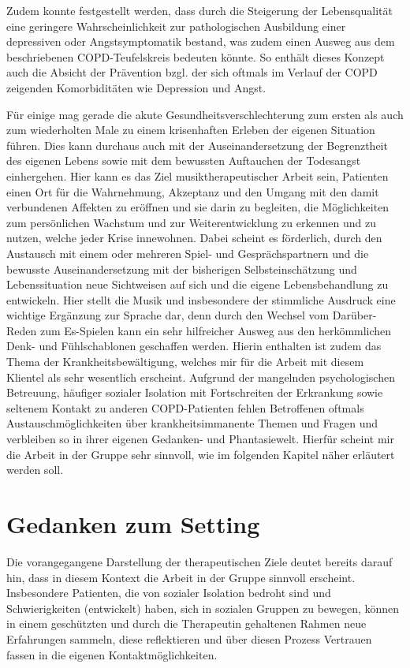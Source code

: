 Zudem konnte festgestellt werden, dass durch die Steigerung der Lebensqualität eine geringere Wahrscheinlichkeit zur pathologischen Ausbildung einer depressiven oder Angstsymptomatik bestand, was zudem einen Ausweg aus dem beschriebenen COPD-Teufelskreis bedeuten könnte. So enthält dieses Konzept auch die Absicht der Prävention bzgl. der sich oftmals im Verlauf der COPD zeigenden Komorbiditäten wie Depression und Angst.

Für einige mag gerade die akute Gesundheitsverschlechterung zum ersten als auch zum wiederholten Male zu einem krisenhaften Erleben der eigenen Situation führen. Dies kann durchaus auch mit der Auseinandersetzung der Begrenztheit des eigenen Lebens sowie mit dem bewussten Auftauchen der Todesangst einhergehen. Hier kann es das Ziel musiktherapeutischer Arbeit sein, Patienten einen Ort für die Wahrnehmung, Akzeptanz und den Umgang mit den damit verbundenen Affekten zu eröffnen und sie darin zu begleiten, die Möglichkeiten zum persönlichen Wachstum und zur Weiterentwicklung zu erkennen und zu nutzen, welche jeder Krise innewohnen. Dabei scheint es förderlich, durch den Austausch mit einem oder mehreren Spiel- und Gesprächspartnern und die bewusste Auseinandersetzung mit der bisherigen Selbsteinschätzung und Lebenssituation neue Sichtweisen auf sich und die eigene Lebensbehandlung zu entwickeln. Hier stellt die Musik und insbesondere der stimmliche Ausdruck eine wichtige Ergänzung zur Sprache dar, denn durch den Wechsel vom Darüber-Reden zum Es-Spielen kann ein sehr hilfreicher Ausweg aus den herkömmlichen Denk- und Fühlschablonen geschaffen werden. Hierin enthalten ist zudem das Thema der Krankheitsbewältigung, welches mir für die Arbeit mit diesem Klientel als sehr wesentlich erscheint. Aufgrund der mangelnden psychologischen Betreuung, häufiger sozialer Isolation mit Fortschreiten der Erkrankung sowie seltenem Kontakt zu anderen COPD-Patienten fehlen Betroffenen oftmals Austauschmöglichkeiten über krankheitsimmanente Themen und Fragen und verbleiben so in ihrer eigenen Gedanken- und Phantasiewelt. Hierfür scheint mir die Arbeit in der Gruppe sehr sinnvoll, wie im folgenden Kapitel näher erläutert werden soll.

\section{Gedanken zum Setting}
\label{section:gedanken_zum_setting}
Die vorangegangene Darstellung der therapeutischen Ziele deutet bereits darauf hin, dass in diesem Kontext die Arbeit in der Gruppe sinnvoll erscheint. Insbesondere Patienten, die von sozialer Isolation bedroht sind und Schwierigkeiten (entwickelt) haben, sich in sozialen Gruppen zu bewegen, können in einem geschützten und durch die Therapeutin gehaltenen Rahmen neue Erfahrungen sammeln, diese reflektieren und über diesen Prozess Vertrauen fassen in die eigenen Kontaktmöglichkeiten.

